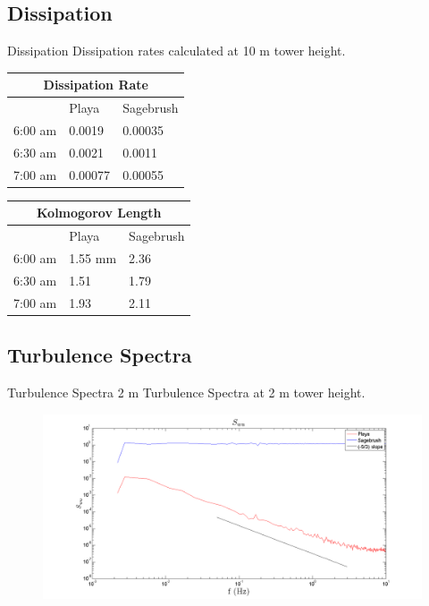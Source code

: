 \documentclass{beamer}
\begin{document}

\subsection{Dissipation}
\begin{frame}{Dissipation}
Dissipation rates calculated at 10 m tower height.
\begin{table}
\begin{minipage}[b]{0.45\linewidth}
\centering
\begin{tabular}{| p || p | p |}
	\hline
	\multicolumn{3}{|c|}{Dissipation Rate} \\
	\hline
	& Playa & Sagebrush \\
	\hline
	6:00 am & 0.0019 & 0.00035 \\
	6:30 am & 0.0021 & 0.0011 \\
	7:00 am & 0.00077 & 0.00055 \\
	\hline
\end{tabular}
\end{minipage}%
\begin{minipage}[b]{0.45\linewidth}
\centering
\begin{tabular}{| p || p | p |}
	\hline
	\multicolumn{3}{|c|}{Kolmogorov Length} \\
	\hline
	& Playa & Sagebrush \\
	\hline
	6:00 am & 1.55 mm & 2.36 \\
	6:30 am & 1.51 & 1.79 \\
	7:00 am & 1.93 & 2.11 \\
	\hline
\end{tabular}
\end{minipage}%
\end{table}
\end{frame}

\subsection{Turbulence Spectra}
\begin{frame}{Turbulence Spectra 2 m}
Turbulence Spectra at 2 m tower height.
\begin{figure}
\centering
\includegraphics[width=\linewidth]{plots/S_uu.png}
\end{figure}
\end{frame}
\end{document}
